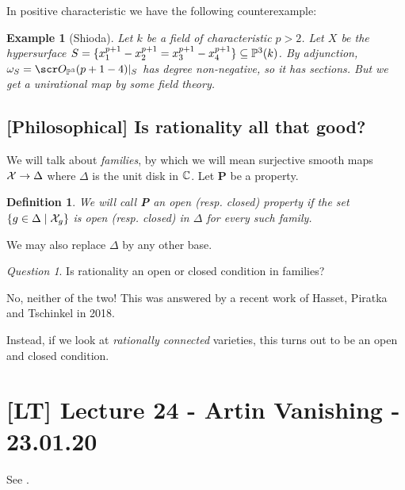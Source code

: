 \documentclass[A4paper, british]{amsart}
\theoremstyle{darkgreentheorem}
\theoremstyle{darkbluedefinition}
\newtheorem{defn}[thm]{Definition}
\theoremstyle{darkredexample}
\newtheorem{exa}[thm]{Example}
\theoremstyle{remark}
\newtheorem{q}[thm]{Question}
\newcommand{\1}{\mathbbm{1}}
\newcommand{\sub}{\subseteq}
\begin{document}
In positive characteristic we have the following counterexample:
\begin{exa}[Shioda]
    Let $k$ be a field of characteristic $p>2$.
    Let $X$ be the hypersurface $S=\{ x_{1}^{p+1}-x_{2}^{p+1}= x_{3}^{p+1}-x_{4}^{p+1} \} \sub \P^{3}(k)$.
    By adjunction, $\w_{S}=\O_{\P^{3}}(p+1-4)|_{S}$ has degree non-negative, so it has sections.
    But we get a unirational map by some field theory.
\end{exa}

\subsection{[Philosophical] Is rationality all that good?}

We will talk about \textit{families}, by which we will mean surjective smooth maps $\mathcal{X}\to \Delta$ where $\Delta$ is the unit disk in $\mathbb{C}$.
Let \textbf{P} be a property.

\begin{defn}
    We will call \textbf{P} an \textit{open} (resp. \textit{closed}) property if the set $\{g\in \Delta \mid \mathcal{X}_{g}\}$ is open (resp. closed) in $\Delta$ for every such family.
\end{defn}

We may also replace $\Delta$ by any other base.

\begin{q}
    Is rationality an open or closed condition in families?
\end{q}

No, neither of the two!
This was answered by a recent work of Hasset, Piratka and Tschinkel in 2018.

Instead, if we look at \textit{rationally connected} varieties, this turns out to be an open and closed condition.

\section{[LT] Lecture 24 - Artin Vanishing - 23.01.20}

See \cite{voi03}.



\end{document}
